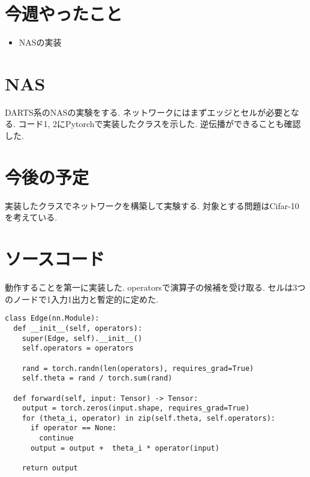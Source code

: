 \documentclass[twocolumn]{jarticle}     %
\begin{document}


\section{今週やったこと}
\begin{itemize}
	\item {NASの実装}
\end{itemize}

\section{NAS}
DARTS系のNASの実験をする.
ネットワークにはまずエッジとセルが必要となる.
コード1, 2にPytorchで実装したクラスを示した.
逆伝播ができることも確認した.


\section{今後の予定}
実装したクラスでネットワークを構築して実験する.
対象とする問題はCifar-10を考えている.


\section{ソースコード}

動作することを第一に実装した.
operatorsで演算子の候補を受け取る.
セルは3つのノードで1入力1出力と暫定的に定めた.

\begin{lstlisting}[caption=Edge,label=Edge]
class Edge(nn.Module):
  def __init__(self, operators):
    super(Edge, self).__init__()
    self.operators = operators

    rand = torch.randn(len(operators), requires_grad=True)
    self.theta = rand / torch.sum(rand)

  def forward(self, input: Tensor) -> Tensor:
    output = torch.zeros(input.shape, requires_grad=True)
    for (theta_i, operator) in zip(self.theta, self.operators):
      if operator == None:
        continue
      output = output +  theta_i * operator(input)

    return output
\end{lstlisting}
\end{document}
